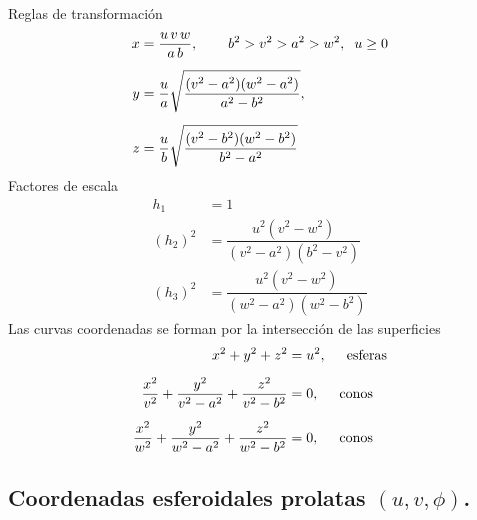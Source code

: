 \documentclass[hidelinks,12pt]{article}
\begin{document}
Reglas de transformación
\begin{align*}
    x &= \dfrac{u \, v \, w}{a \, b}, \hspace{0.75cm} b^{2} > v^{2} > a^{2} > w^{2}, \hspace{0.2cm} u \geq 0 \\[0.5em]
    y &= \dfrac{u}{a} \sqrt{\dfrac{(v^{2} - a^{2})(w^{2} - a^{2})}{a^{2} - b^{2}}}, \\[0.5em]
    z &= \dfrac{u}{b} \sqrt{\dfrac{(v^{2} - b^{2})(w^{2} - b^{2})}{b^{2} - a^{2}}}
\end{align*}
Factores de escala
\begin{align*}
    h_{1} &= 1 \\[0.5em]
    (h_{2})^{2} &= \dfrac{u^{2}(v^{2} - w^{2})}{(v^{2} - a^{2})(b^{2} - v^{2})} \\[0.5em] 
    (h_{3})^{2} &= \dfrac{u^{2}(v^{2} - w^{2})}{(w^{2} - a^{2})(w^{2} - b^{2})}
\end{align*}
Las curvas coordenadas se forman por la intersección de las superficies
\begin{align*}
    x^{2} + y^{2} + z^{2} &= u^{2}, \hspace{0.5cm} \text{esferas} \\[0.5em]
    \dfrac{x^{2}}{v^{2}} + \dfrac{y^{2}}{v^{2} - a^{2}} + \dfrac{z^{2}}{v^{2} - b^{2}} &= 0, \hspace{0.5cm} \text{conos} \\[0.5em]
    \dfrac{x^{2}}{w^{2}} + \dfrac{y^{2}}{w^{2} - a^{2}} + \dfrac{z^{2}}{w^{2} - b^{2}} &= 0, \hspace{0.5cm} \text{conos}
\end{align*}

\subsection{Coordenadas esferoidales prolatas \texorpdfstring{$(u, v, \phi)$}{(u, v, f)}.}
\end{document}
